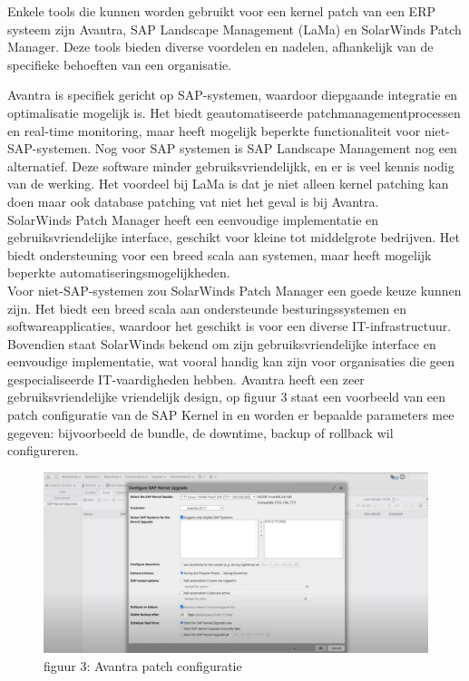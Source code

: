 \documentclass[dutch,dit,thesis]{hogentreport}
\begin{document}
Enkele tools die kunnen worden gebruikt voor een kernel patch van een ERP systeem zijn Avantra, SAP Landscape Management (LaMa) en SolarWinds Patch Manager. Deze tools bieden diverse voordelen en nadelen, afhankelijk van de specifieke behoeften van een organisatie.

 Avantra is specifiek gericht op SAP-systemen, waardoor diepgaande integratie en optimalisatie mogelijk is. Het biedt geautomatiseerde patchmanagementprocessen en real-time monitoring, maar heeft 
 mogelijk beperkte functionaliteit voor niet-SAP-systemen. Nog voor SAP systemen is SAP Landscape Management nog een alternatief. Deze software minder gebruiksvriendelijkk, en er is veel kennis nodig van de werking. Het voordeel 
 bij LaMa is dat je niet alleen kernel patching kan doen maar ook database patching vat niet het geval is bij Avantra. \\
 SolarWinds Patch Manager heeft een eenvoudige implementatie en gebruiksvriendelijke interface, geschikt voor kleine tot middelgrote bedrijven. Het biedt ondersteuning voor een breed scala aan 
 systemen, maar heeft mogelijk beperkte automatiseringsmogelijkheden. \\


 Voor niet-SAP-systemen zou SolarWinds Patch Manager een goede keuze kunnen zijn. Het biedt een breed scala aan ondersteunde besturingssystemen en softwareapplicaties, waardoor het geschikt is voor
  een diverse IT-infrastructuur. Bovendien staat SolarWinds bekend om zijn gebruiksvriendelijke interface en eenvoudige implementatie, wat vooral handig kan zijn voor organisaties die geen gespecialiseerde IT-vaardigheden hebben.
 Avantra heeft een zeer gebruiksvriendelijke vriendelijk design, op figuur 3 staat een voorbeeld van een patch configuratie van de SAP Kernel in en worden er bepaalde parameters mee gegeven: bijvoorbeeld de bundle, de downtime, backup of 
 rollback wil configureren.
 

\begin{figure}[htbp]
    \centering
    \includegraphics[width=\textwidth]{avantra1.png}
    \caption{figuur 3: Avantra patch configuratie}
     \label{fig:avantra1}
\end{figure}
\end{document}
